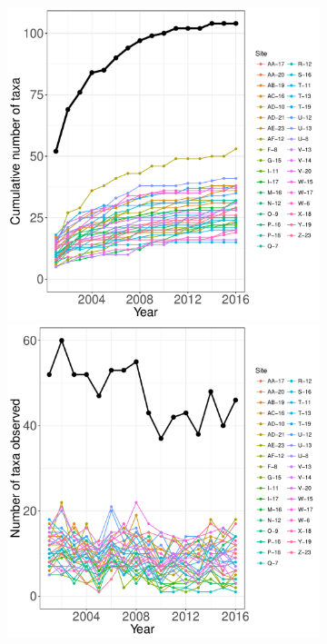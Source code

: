 \documentclass[11pt, oneside]{article}
\begin{document}
\begin{figure}[h!]
\begin{figure}[h!]
\centering
\includegraphics[scale = 0.4]{cap-birds-banville_species_accumulation_curve.pdf}
\includegraphics[scale = 0.4]{cap-birds-banville_num_taxa_over_time.pdf}

\end{figure}
\end{figure}
\end{document}

